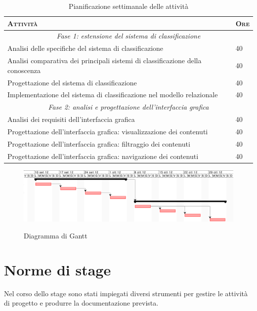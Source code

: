 \begin{table}[ht]
\centering
\begin{tabular}{|p{11cm}|p{1cm}|}
\hline
\textsc{Attività} & \textsc{Ore} \\ \hline
\multicolumn{2}{|c|}{\textit{Fase 1: estensione del sistema di classificazione}} \\ \hline 
Analisi delle specifiche del sistema di classificazione & 40 \\ \hline
Analisi comparativa dei principali sistemi di classificazione della conoscenza & 40 \\ \hline
Progettazione del sistema di classificazione & 40 \\ \hline
Implementazione del sistema di classificazione nel modello relazionale & 40 \\ \hline
\multicolumn{2}{|c|}{\textit{Fase 2: analisi e progettazione dell'interfaccia grafica}} \\ \hline 
Analisi dei requisiti dell'interfaccia grafica & 40 \\ \hline
Progettazione dell'interfaccia grafica: visualizzazione dei contenuti & 40 \\ \hline
Progettazione dell'interfaccia grafica: filtraggio dei contenuti & 40 \\ \hline
Progettazione dell'interfaccia grafica: navigazione dei contenuti & 40 \\ \hline
\end{tabular}
\caption{Pianificazione settimanale delle attività}
\label{tab:tesi:stage:pianificazione}
\end{table}

\begin{figure}[ht]
	\begin{center}
		\includegraphics[width=13cm]{img/gantt.png}
		\label{fig:tesi:stage:gantt}
		\caption{Diagramma di Gantt}
	\end{center}
\end{figure}

\section{Norme di stage}
Nel corso dello stage sono stati impiegati diversi strumenti per gestire le attività di progetto e produrre la documentazione prevista.

